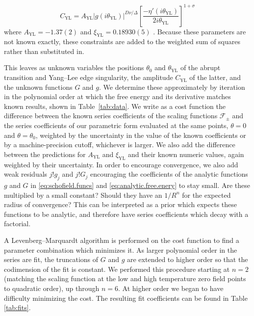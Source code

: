 \documentclass[
aps,
pre,
preprint,
longbibliography,
floatfix
]{revtex4-2}
\begin{document}
\begin{equation}
  C_\mathrm{YL}=A_\mathrm{YL}|g(i\theta_\mathrm{YL})|^{D\nu/\Delta}\left[\frac{-\eta'(i\theta_\mathrm{YL})}{2i\theta_\mathrm{YL}}\right]^{1+\sigma}
\end{equation}
where $A_\mathrm{YL}=-1.37(2)$ and $\xi_\mathrm{YL}=0.18930(5)$
\cite{Fonseca_2003_Ising}. Because these parameters are not known exactly,
these constraints are added to the weighted sum of squares rather than
substituted in.

This leaves as unknown variables the positions $\theta_0$ and
$\theta_{\mathrm{YL}}$ of the abrupt transition and Yang--Lee edge singularity,
the amplitude $C_\mathrm{YL}$ of the latter, and the unknown functions $G$ and
$g$. We determine these approximately by iteration in the polynomial order at
which the free energy and its derivative matches known results, shown in
Table~\ref{tab:data}. We write as a cost function the difference between the
known series coefficients of the scaling functions $\mathcal F_\pm$ and the
series coefficients of our parametric form evaluated at the same points,
$\theta=0$ and $\theta=\theta_0$, weighted by the uncertainty in the value of
the known coefficients or by a machine-precision cutoff, whichever is larger.
We also add the difference between the predictions for $A_\mathrm{YL}$ and
$\xi_\mathrm{YL}$ and their known numeric values, again weighted by their
uncertainty. In order to encourage convergence, we also add weak residuals
$j!g_j$ and $j!G_j$ encouraging the coefficients of the analytic functions $g$ and $G$ in
\eqref{eq:schofield.funcs} and \eqref{eq:analytic.free.enery} to stay small. {\color{blue} Are these multiplied by a small constant? Should they have an $1/R^n$ for the expected radius of convergence?} This can be interpreted as a prior which expects these functions to be analytic, and therefore have series coefficients which decay with a factorial.

A Levenberg--Marquardt algorithm is performed on the cost function to find a parameter combination which minimizes it. As larger polynomial order in the
series are fit, the truncations of $G$ and $g$ are extended to higher order so
that the codimension of the fit is constant.
We performed this procedure starting at $n=2$ (matching the scaling
function at the low and high temperature zero field points to quadratic order), up
through $n=6$. At higher order we began to have difficulty minimizing the cost.
The resulting fit coefficients can be found in Table \ref{tab:fits}.
\end{document}
